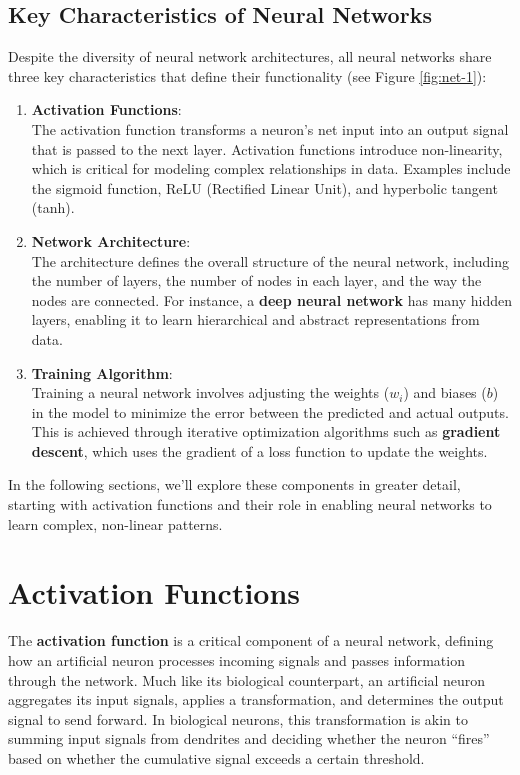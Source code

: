 \documentclass[
]{book}
\theoremstyle{definition}
\theoremstyle{definition}
\theoremstyle{definition}
\theoremstyle{definition}
\theoremstyle{remark}
\begin{document}
\subsection*{Key Characteristics of Neural Networks}\label{key-characteristics-of-neural-networks}

Despite the diversity of neural network architectures, all neural networks share three key characteristics that define their functionality (see Figure \ref{fig:net-1}):

\begin{enumerate}
\def\labelenumi{\arabic{enumi}.}
\item
  \textbf{Activation Functions}:\\
  The activation function transforms a neuron's net input into an output signal that is passed to the next layer. Activation functions introduce non-linearity, which is critical for modeling complex relationships in data. Examples include the sigmoid function, ReLU (Rectified Linear Unit), and hyperbolic tangent (tanh).
\item
  \textbf{Network Architecture}:\\
  The architecture defines the overall structure of the neural network, including the number of layers, the number of nodes in each layer, and the way the nodes are connected. For instance, a \textbf{deep neural network} has many hidden layers, enabling it to learn hierarchical and abstract representations from data.
\item
  \textbf{Training Algorithm}:\\
  Training a neural network involves adjusting the weights (\(w_i\)) and biases (\(b\)) in the model to minimize the error between the predicted and actual outputs. This is achieved through iterative optimization algorithms such as \textbf{gradient descent}, which uses the gradient of a loss function to update the weights.
\end{enumerate}

In the following sections, we'll explore these components in greater detail, starting with activation functions and their role in enabling neural networks to learn complex, non-linear patterns.

\section{Activation Functions}\label{activation-functions}

The \textbf{activation function} is a critical component of a neural network, defining how an artificial neuron processes incoming signals and passes information through the network. Much like its biological counterpart, an artificial neuron aggregates its input signals, applies a transformation, and determines the output signal to send forward. In biological neurons, this transformation is akin to summing input signals from dendrites and deciding whether the neuron ``fires'' based on whether the cumulative signal exceeds a certain threshold.
\end{document}

